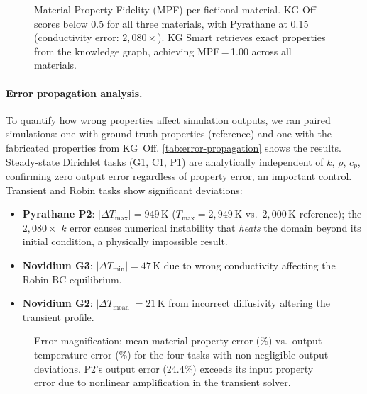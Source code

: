\documentclass[twocolumn]{article}
\begin{document}
\begin{figure}[htbp]
  \centering
  
  \caption{Material Property Fidelity (MPF) per fictional material.
    KG Off scores below 0.5 for all three materials, with Pyrathane
    at 0.15 (conductivity error: $2{,}080\times$).  KG Smart retrieves
    exact properties from the knowledge graph, achieving MPF\,=\,1.00
    across all materials.}
  \label{fig:mpf}
\end{figure}

\paragraph{Error propagation analysis.}
\label{sec:error-propagation}
To quantify how wrong properties affect simulation outputs, we ran
paired simulations: one with ground-truth properties (reference) and
one with the fabricated properties from KG~Off.  \cref{tab:error-propagation}
shows the results.  Steady-state Dirichlet tasks (G1, C1, P1) are
analytically independent of $k$, $\rho$, $c_p$, confirming zero output
error regardless of property error, an important control.  Transient
and Robin tasks show significant deviations:

\begin{itemize}
  \item \textbf{Pyrathane P2}: $|\Delta T_{\max}|{=}949$\,K
        ($T_{\max}{=}2{,}949$\,K vs.\ $2{,}000$\,K reference); the
        $2{,}080\times$ $k$ error causes numerical instability that
        \emph{heats} the domain beyond its initial condition, a
        physically impossible result.
  \item \textbf{Novidium G3}: $|\Delta T_{\min}|{=}47$\,K due to
        wrong conductivity affecting the Robin BC equilibrium.
  \item \textbf{Novidium G2}: $|\Delta T_{\text{mean}}|{=}21$\,K
        from incorrect diffusivity altering the transient profile.
\end{itemize}



\begin{figure}[htbp]
  \centering
  
  \caption{Error magnification: mean material property error (\%)
    vs.\ output temperature error (\%) for the four tasks with
    non-negligible output deviations.  P2's output error (24.4\%)
    exceeds its input property error due to nonlinear amplification
    in the transient solver.}
  \label{fig:error-mag}
\end{figure}
\end{document}
